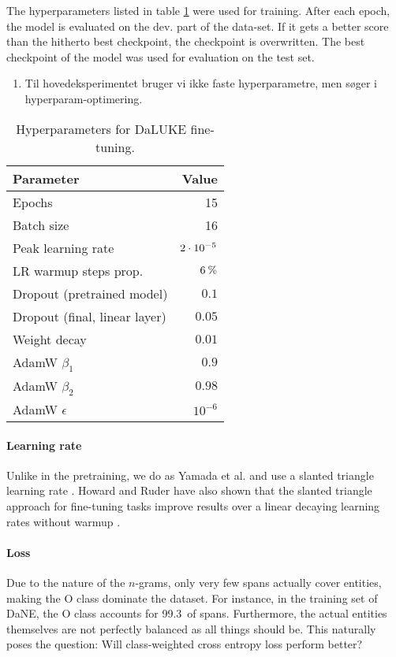\documentclass[main.tex]{subfiles}
\begin{document}
The hyperparameters listed in table \ref{tab:finetune-hyper} were used for training.
After each epoch, the model is evaluated on the dev. part of the data-set.
If it gets a better score than the hitherto best checkpoint, the checkpoint is overwritten.
The best checkpoint of the model was used for evaluation on the test set.
\begin{enumerate}
    \item Til hovedeksperimentet bruger vi ikke faste hyperparametre, men søger i hyperparam-optimering.
\end{enumerate}
\begin{table}[H]
    \centering
    \begin{tabular}{l|r}
        Parameter  &    Value\\\hline
        Epochs     & 15\\
        Batch size &    16\\
        Peak learning rate & $2\cdot10^{-5}$\\
        LR warmup steps prop. & $ 6\:\text{\%{}} $\\
        Dropout (pretrained model) & $ 0.1 $\\
        Dropout (final, linear layer) & $ 0.05 $\\
        Weight decay & $ 0.01 $\\
        AdamW $ \beta_1 $ & $ 0.9 $\\
        AdamW $ \beta_2 $ & $ 0.98 $\\
        AdamW $ \epsilon $ & $ 10^{-6} $
    \end{tabular}
    \caption{Hyperparameters for DaLUKE fine-tuning.}\label{tab:finetune-hyper}
\end{table}\noindent

\paragraph{Learning rate}
Unlike in the pretraining, we do as Yamada et al. and use a slanted triangle learning rate \cite{yamada2020luke}.
Howard and Ruder have also shown that the slanted triangle approach for fine-tuning tasks improve results over a linear decaying learning rates without warmup \cite{howardruder2018universal}.

\paragraph{Loss}
Due to the nature of the $ n $-grams, only very few spans actually cover entities, making the O class dominate the dataset.
For instance, in the training set of DaNE, the O class accounts for 99.3\pro\ of spans.
Furthermore, the actual entities themselves are not perfectly balanced as all things should be.
This naturally poses the question: Will class-weighted cross entropy loss perform better?
\end{document}
